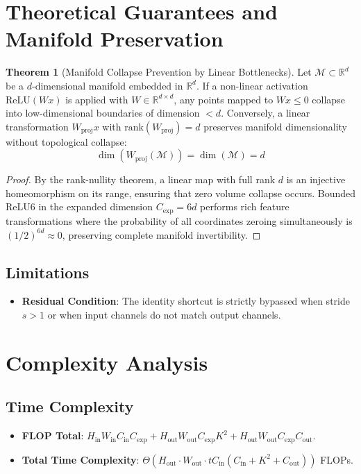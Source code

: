 \documentclass[11pt,a4paper]{article}
\theoremstyle{definition}
\newtheorem{theorem}{Theorem}[section]
\begin{document}
\section{Theoretical Guarantees and Manifold Preservation}

\begin{theorem}[Manifold Collapse Prevention by Linear Bottlenecks]
Let $\mathcal{M} \subset \mathbb{R}^d$ be a $d$-dimensional manifold embedded in $\mathbb{R}^d$. If a non-linear activation $\text{ReLU}(W x)$ is applied with $W \in \mathbb{R}^{d \times d}$, any points mapped to $W x \le 0$ collapse into low-dimensional boundaries of dimension $< d$. Conversely, a linear transformation $W_{\text{proj}} x$ with $\text{rank}(W_{\text{proj}}) = d$ preserves manifold dimensionality without topological collapse:
\begin{equation}
\dim(W_{\text{proj}}(\mathcal{M})) = \dim(\mathcal{M}) = d
\end{equation}
\end{theorem}

\begin{proof}
By the rank-nullity theorem, a linear map with full rank $d$ is an injective homeomorphism on its range, ensuring that zero volume collapse occurs. Bounded ReLU6 in the expanded dimension $C_{\text{exp}} = 6d$ performs rich feature transformations where the probability of all coordinates zeroing simultaneously is $(1/2)^{6d} \approx 0$, preserving complete manifold invertibility.
\end{proof}

\subsection{Limitations}
\begin{itemize}
    \item \textbf{Residual Condition}: The identity shortcut is strictly bypassed when stride $s > 1$ or when input channels do not match output channels.
\end{itemize}

\section{Complexity Analysis}

\subsection{Time Complexity}
\begin{itemize}
    \item \textbf{FLOP Total}: $H_{\text{in}} W_{\text{in}} C_{\text{in}} C_{\text{exp}} + H_{\text{out}} W_{\text{out}} C_{\text{exp}} K^2 + H_{\text{out}} W_{\text{out}} C_{\text{exp}} C_{\text{out}}$.
    \item \textbf{Total Time Complexity}: $\Theta(H_{\text{out}} \cdot W_{\text{out}} \cdot t C_{\text{in}} (C_{\text{in}} + K^2 + C_{\text{out}}))$ FLOPs.
\end{itemize}
\end{document}
